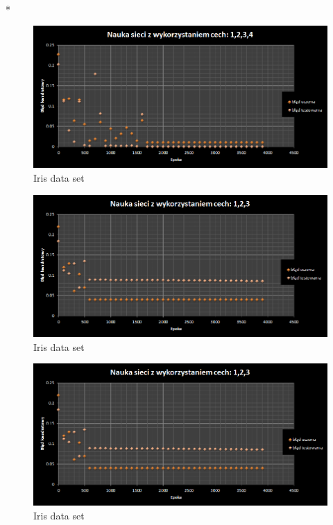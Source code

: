 \documentclass{classrep}
\begin{document}
\\*

\begin{figure}[ht]
\centering
			\includegraphics[scale=0.65]{pictures/Iris01.png}
	\caption{Iris data set}
	\label{fig:Iris data set}
\end{figure}

\begin{figure}[ht]
\centering
			\includegraphics[scale=0.65]{pictures/Iris02.png}
	\caption{Iris data set}
	\label{fig:Iris data set}
\end{figure}

\begin{figure}[ht]
\centering
			\includegraphics[scale=0.65]{pictures/Iris03.png}
	\caption{Iris data set}
	\label{fig:Iris data set}
\end{figure}
\end{document}

